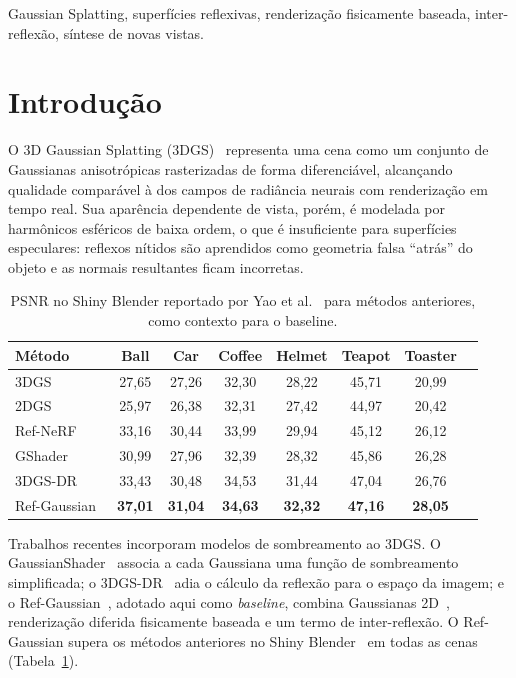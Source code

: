 \documentclass[conference]{IEEEtran}
\begin{document}
\begin{IEEEkeywords}
Gaussian Splatting, superfícies reflexivas, renderização fisicamente baseada, inter-reflexão, síntese de novas vistas.
\end{IEEEkeywords}

\section{Introdução}

O 3D Gaussian Splatting (3DGS)~\cite{kerbl2023} representa uma cena como um conjunto de Gaussianas anisotrópicas rasterizadas de forma diferenciável, alcançando qualidade comparável à dos campos de radiância neurais com renderização em tempo real. Sua aparência dependente de vista, porém, é modelada por harmônicos esféricos de baixa ordem, o que é insuficiente para superfícies especulares: reflexos nítidos são aprendidos como geometria falsa ``atrás'' do objeto e as normais resultantes ficam incorretas.

\begin{table}[t]
\centering
\caption{PSNR no Shiny Blender reportado por Yao et al.~\cite{yao2025refgaussian} para métodos anteriores, como contexto para o baseline.}
\label{tab:sota}
\setlength{\tabcolsep}{3pt}
\begin{tabular}{lccccccc}
\toprule
Método & Ball & Car & Coffee & Helmet & Teapot & Toaster \\
\midrule
3DGS~\cite{kerbl2023}                    & 27,65 & 27,26 & 32,30 & 28,22 & 45,71 & 20,99 \\
2DGS~\cite{huang2024_2dgs}               & 25,97 & 26,38 & 32,31 & 27,42 & 44,97 & 20,42 \\
Ref-NeRF~\cite{verbin2022refnerf}        & 33,16 & 30,44 & 33,99 & 29,94 & 45,12 & 26,12 \\
GShader~\cite{jiang2024gaussianshader}   & 30,99 & 27,96 & 32,39 & 28,32 & 45,86 & 26,28 \\
3DGS-DR~\cite{ye2024dr}                  & 33,43 & 30,48 & 34,53 & 31,44 & 47,04 & 26,76 \\
Ref-Gaussian~\cite{yao2025refgaussian}   & \textbf{37,01} & \textbf{31,04} & \textbf{34,63} & \textbf{32,32} & \textbf{47,16} & \textbf{28,05} \\
\bottomrule
\end{tabular}
\end{table}

Trabalhos recentes incorporam modelos de sombreamento ao 3DGS. O GaussianShader~\cite{jiang2024gaussianshader} associa a cada Gaussiana uma função de sombreamento simplificada; o 3DGS-DR~\cite{ye2024dr} adia o cálculo da reflexão para o espaço da imagem; e o Ref-Gaussian~\cite{yao2025refgaussian}, adotado aqui como \textit{baseline}, combina Gaussianas 2D~\cite{huang2024_2dgs}, renderização diferida fisicamente baseada e um termo de inter-reflexão. O Ref-Gaussian supera os métodos anteriores no Shiny Blender~\cite{verbin2022refnerf} em todas as cenas (Tabela~\ref{tab:sota}).
\end{document}
